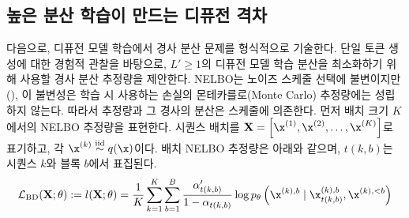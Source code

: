 \documentclass{article} %
\newcommand{\vkl}[1]{\textcolor{blue}{[VK: #1]}}
\begin{document}
\subsection{높은 분산 학습이 만드는 디퓨전 격차}
다음으로, 디퓨전 모델 학습에서 경사 분산 문제를 형식적으로 기술한다. 단일 토큰 생성에 대한 경험적 관찰을 바탕으로, $L' \geq 1$의 디퓨전 모델 학습 분산을 최소화하기 위해 사용할 경사 분산 추정량을 제안한다. NELBO는 노이즈 스케줄 선택에 불변이지만(), 이 불변성은 학습 시 사용하는 손실의 몬테카를로(Monte Carlo) 추정량에는 성립하지 않는다. %
따라서 추정량과 그 경사의 분산은 스케줄에 의존한다. 먼저 배치 크기 $K$에서의 NELBO 추정량을 표현한다. %
시퀀스 배치를 $\mathbf{X} = \left[\x^{(1)}, \x^{(2)}, \ldots, \x^{(K)}\right]$로 표기하고, 각 $\x^{(k)}\overset{\text{iid}}\sim q(\x)$이다. 배치 NELBO 추정량은 아래와 같으며, $t(k, b)$는 시퀀스 $k$와 블록 $b$에서 표집된다.
\begin{align}
\mathcal{L}_\text{BD}(\mathbf{X}; \theta)
:= l(\mathbf{X}; \theta)
= \frac{1}{K} \sum_{k=1}^K \sum_{b=1}^B  \frac{\alpha_{t(k, b)}'}{1-\alpha_{t(k,b)}}
\log p_\theta \left(
    \x^{(k),b} \mid \x_{t(k,b)}^{(k),b}, \x^{(k), <b}
\right)
\end{align}




\end{document}
